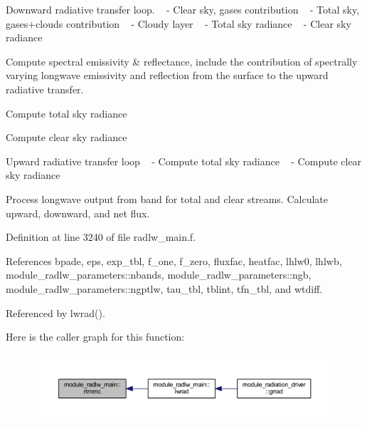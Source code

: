 \begin{DoxyEnumerate}
\item Downward radiative transfer loop. ~\newline
 -\/ Clear sky, gases contribution ~\newline
 -\/ Total sky, gases+clouds contribution ~\newline
 -\/ Cloudy layer ~\newline
 -\/ Total sky radiance ~\newline
 -\/ Clear sky radiance
\item Compute spectral emissivity \& reflectance, include the contribution of spectrally varying longwave emissivity and reflection from the surface to the upward radiative transfer.
\item Compute total sky radiance
\item Compute clear sky radiance
\item Upward radiative transfer loop ~\newline
 -\/ Compute total sky radiance ~\newline
 -\/ Compute clear sky radiance
\item Process longwave output from band for total and clear streams. Calculate upward, downward, and net flux. 
\end{DoxyEnumerate}

Definition at line 3240 of file radlw\+\_\+main.\+f.



References bpade, eps, exp\+\_\+tbl, f\+\_\+one, f\+\_\+zero, fluxfac, heatfac, lhlw0, lhlwb, module\+\_\+radlw\+\_\+parameters\+::nbands, module\+\_\+radlw\+\_\+parameters\+::ngb, module\+\_\+radlw\+\_\+parameters\+::ngptlw, tau\+\_\+tbl, tblint, tfn\+\_\+tbl, and wtdiff.



Referenced by lwrad().



Here is the caller graph for this function\+:
\nopagebreak
\begin{figure}[H]
\begin{center}
\leavevmode
\includegraphics[width=350pt]{group__module__radlw__main_gaf0e13eadc5dad88e144734d2c6b9fd0f_icgraph}
\end{center}
\end{figure}


